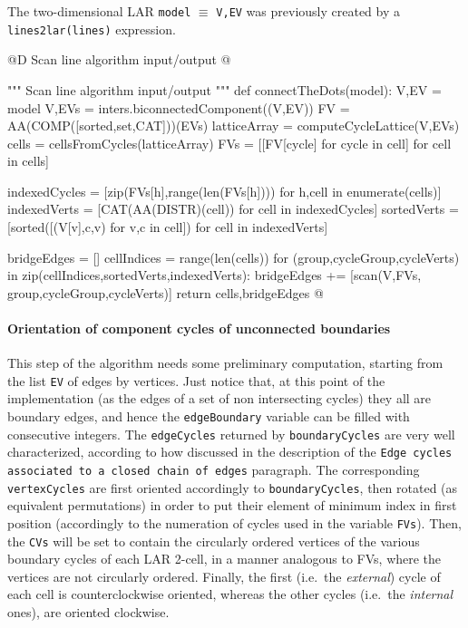 \documentclass[11pt,oneside]{article}    %
\begin{document}
The two-dimensional LAR \texttt{model} $\equiv$ \texttt{V,EV} was previously created by a \texttt{lines2lar(lines)} expression.

@D Scan line algorithm input/output
@{""" Scan line algorithm input/output """
def connectTheDots(model):
    V,EV = model
    V,EVs = inters.biconnectedComponent((V,EV))
    FV = AA(COMP([sorted,set,CAT]))(EVs)
    latticeArray = computeCycleLattice(V,EVs)
    cells = cellsFromCycles(latticeArray)
    FVs = [[FV[cycle] for cycle in cell] for cell in cells]
    
    indexedCycles = [zip(FVs[h],range(len(FVs[h])))   for h,cell in enumerate(cells)]
    indexedVerts = [CAT(AA(DISTR)(cell)) for cell in indexedCycles]
    sortedVerts = [sorted([(V[v],c,v) for v,c in cell]) for cell in indexedVerts]
    
    bridgeEdges = []
    cellIndices = range(len(cells))
    for (group,cycleGroup,cycleVerts) in zip(cellIndices,sortedVerts,indexedVerts):
        bridgeEdges += [scan(V,FVs, group,cycleGroup,cycleVerts)]
    return cells,bridgeEdges
@}

\paragraph{Orientation of component cycles of unconnected boundaries}

This step of the algorithm needs some preliminary computation, starting from the list \texttt{EV} of edges by vertices. Just notice that, at this point of the implementation (as the edges of a set of non intersecting cycles) they all are boundary edges, and hence the \texttt{edgeBoundary} variable can be filled with consecutive integers. The \texttt{edgeCycles} returned by \texttt{boundaryCycles} are very well characterized, according to how discussed in the description of the \texttt{Edge cycles associated to a closed chain of edges} paragraph.
The corresponding \texttt{vertexCycles} are first oriented accordingly to \texttt{boundaryCycles}, then rotated (as equivalent permutations) in order to put their element of minimum index in first position (accordingly to the numeration of cycles used in the variable \texttt{FVs}). Then, the \texttt{CVs} will be set to contain the circularly ordered vertices of the various boundary cycles of each LAR 2-cell, in a manner analogous to FVs, where the vertices are not circularly ordered. Finally, the first (i.e.~the \emph{external}) cycle of each cell is counterclockwise oriented, whereas the other cycles (i.e.~the \emph{internal} ones), are oriented clockwise.
\end{document}

